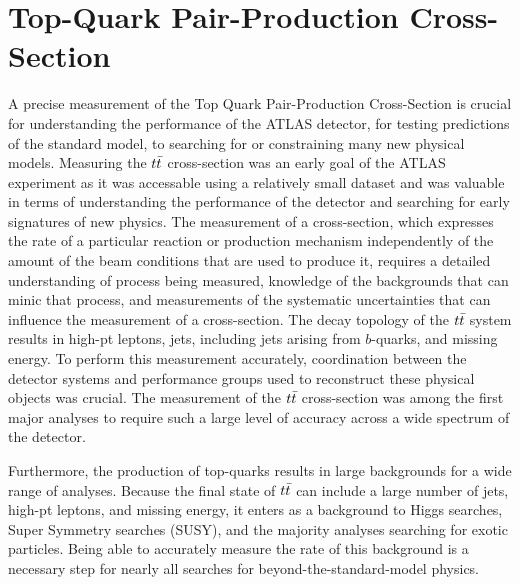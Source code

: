 %
%

\chapter{Top-Quark Pair-Production Cross-Section}

A precise measurement of the Top Quark Pair-Production Cross-Section is crucial for understanding the performance of the ATLAS detector, for testing predictions of the standard model, to searching for or constraining many new physical models.
Measuring the $t\bar{t}$ cross-section was an early goal of the ATLAS experiment as it was accessable using a relatively small dataset and was valuable in terms of understanding the performance of the detector and searching for early signatures of new physics.
The measurement of a cross-section, which expresses the rate of a particular reaction or production mechanism independently of the amount of the beam conditions that are used to produce it,
requires a detailed understanding of process being measured, knowledge of the backgrounds that can minic that process, and measurements of the systematic uncertainties that can influence the measurement of a cross-section.
The decay topology of the $t\bar{t}$ system results in high-pt leptons, jets, including jets arising from $b$-quarks, and missing energy.
To perform this measurement accurately, coordination between the detector systems and performance groups used to reconstruct these physical objects was crucial.
The measurement of the $t\bar{t}$ cross-section was among the first major analyses to require such a large level of accuracy across a wide spectrum of the detector. %

Furthermore, the production of top-quarks results in large backgrounds for a wide range of analyses.
Because the final state of $t\bar{t}$ can include a large number of jets, high-pt leptons, and missing energy, it enters as a background to Higgs searches, Super Symmetry searches (SUSY),
and the majority analyses searching for exotic particles.
Being able to accurately measure the rate of this background is a necessary step for nearly all searches for beyond-the-standard-model physics.

